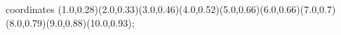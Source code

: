 					coordinates { (1.0,0.28)(2.0,0.33)(3.0,0.46)(4.0,0.52)(5.0,0.66)(6.0,0.66)(7.0,0.7)(8.0,0.79)(9.0,0.88)(10.0,0.93)};